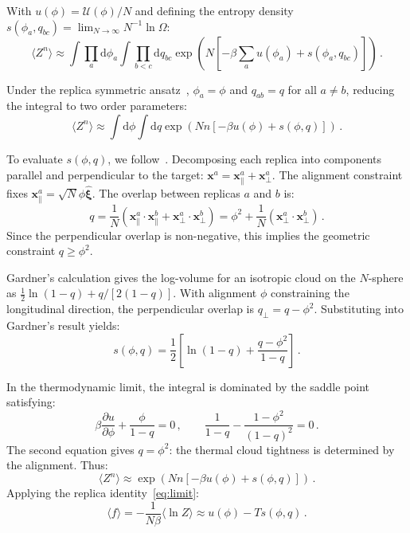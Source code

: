 \documentclass{article}
\newcommand{\dd}{{\mathrm{d}}}
\theoremstyle{plain}
\theoremstyle{definition}
\theoremstyle{remark}
\begin{document}
With $u(\phi) = \mathcal{U}(\phi)/N$ and defining the entropy density $s(\phi_a, q_{bc}) = \lim_{N \to \infty} N^{-1} \ln \Omega$:
\begin{equation}
    \langle Z^n \rangle \approx \int \prod_a \dd \phi_a \int \prod_{b<c} \dd q_{bc} \exp\left( N \left[ -\beta \sum_a u(\phi_a) + s(\phi_a, q_{bc}) \right] \right)\,.
\end{equation}

Under the replica symmetric ansatz~\citep{amit1987statistical}, $\phi_a = \phi$ and $q_{ab} = q$ for all $a \neq b$, reducing the integral to two order parameters:
\begin{equation}
\langle Z^n \rangle \approx \int \dd \phi \int \dd q \exp \left( N n \left[ -\beta u(\phi) + s(\phi, q) \right] \right)\,.
\end{equation}

To evaluate $s(\phi, q)$, we follow~\citet{gardner1988space}. Decomposing each replica into components parallel and perpendicular to the target: $\bm{x}^a = \bm{x}_\parallel^a + \bm{x}_\perp^a$. The alignment constraint fixes $\bm{x}_\parallel^a = \sqrt{N}\phi \hat{\bm{\xi}}$. The overlap between replicas $a$ and $b$ is:
\begin{equation}
    q = \frac{1}{N} \left( \bm{x}_\parallel^a \cdot \bm{x}_\parallel^b + \bm{x}_\perp^a \cdot \bm{x}_\perp^b \right) = \phi^2 + \frac{1}{N} \left( \bm{x}_\perp^a \cdot \bm{x}_\perp^b \right)\,.
\end{equation}
Since the perpendicular overlap is non-negative, this implies the geometric constraint $q \ge \phi^2$.

Gardner's calculation gives the log-volume for an isotropic cloud on the $N$-sphere as $\frac{1}{2}\ln(1-q) + q/[2(1-q)]$. With alignment $\phi$ constraining the longitudinal direction, the perpendicular overlap is $q_\perp = q - \phi^2$. Substituting into Gardner's result yields:
\begin{equation}
    s(\phi, q) = \frac{1}{2} \left[ \ln(1-q) + \frac{q - \phi^2}{1-q} \right]\,.
\end{equation}

In the thermodynamic limit, the integral is dominated by the saddle point satisfying:
\begin{equation}
    \beta \frac{\partial u}{\partial \phi} + \frac{\phi}{1-q} = 0\,,\qquad 
    \frac{1}{1-q} - \frac{1-\phi^2}{(1-q)^2} = 0\,.
\end{equation}
The second equation gives $q = \phi^2$: the thermal cloud tightness is determined by the alignment. Thus:
\begin{equation}
    \langle Z^n \rangle \approx \exp\left( N n [-\beta u(\phi) + s(\phi, q)] \right)\,.
\end{equation}
Applying the replica identity~\eqref{eq:limit}:
\begin{equation}
    \langle f \rangle = -\frac{1}{N\beta} \langle \ln Z \rangle 
    \approx u(\phi) - T s(\phi, q)\,.
\end{equation}
\end{document}
